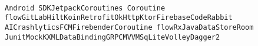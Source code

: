 \documentclass[9pt]{developercv} %
\begin{document}
\vspace{0.5cm} %



\begin{minipage}[t]{0.4\textwidth} %
	\vspace{-\baselineskip} %
	
	\summary \\ %
\end{minipage}
\hfill %
\begin{minipage}[t]{0.5\textwidth} %
	\vspace{-\baselineskip} %
	
	\begin{barchart}{5.5} %
	\end{barchart}
\end{minipage}



\begin{minipage}[t]{0.9\textwidth} %
	\vspace{-\baselineskip} %
	
    
    \texttt{Android SDK}\slashsep\texttt{Jetpack}\slashsep\texttt{Coroutines }\slashsep\texttt{Coroutine flow}\slashsep\texttt{GitLab}\slashsep\texttt{Hilt}\slashsep\texttt{Koin}\slashsep\texttt{Retrofit}\slashsep\texttt{OkHttp}\slashsep\texttt{Ktor}\slashsep\texttt{Firebase}\slashsep\texttt{CodeRabbit AI}\slashsep\texttt{Crashlytics}\slashsep\texttt{FCM}\slashsep\texttt{Firebender}\slashsep\texttt{Coroutine flow}\slashsep\texttt{RxJava}\slashsep\texttt{DataStore}\slashsep\texttt{Room} \slashsep\texttt{Junit}\slashsep\texttt{MockK}\slashsep\texttt{XML}\slashsep\texttt{DataBinding}\slashsep\texttt{GRPC}\slashsep\texttt{MVVM}\slashsep\texttt{SqLite}\slashsep\texttt{Volley}\slashsep\texttt{Dagger2}
\end{minipage}
\end{document}
